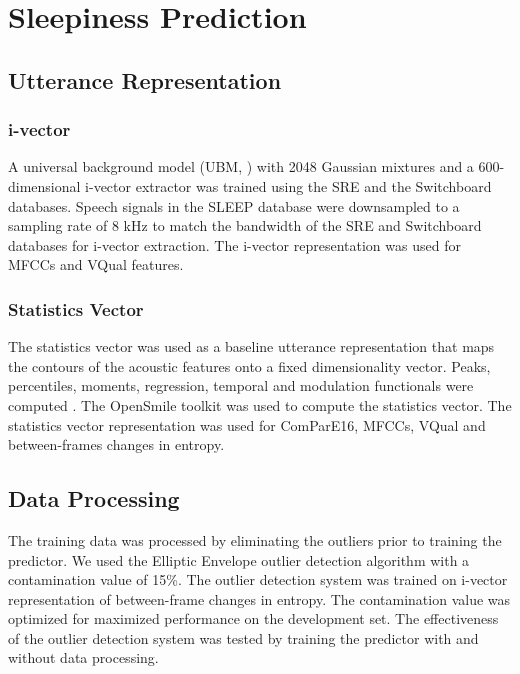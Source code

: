
\section{Sleepiness Prediction}

\subsection{Utterance Representation}
\subsubsection{i-vector}
  
A universal background model (UBM, \cite{dehak2011front}) with 2048 Gaussian mixtures and a 600-dimensional i-vector extractor was trained using the SRE and the Switchboard databases. Speech signals in the SLEEP database were downsampled to a sampling rate of 8 kHz to match the bandwidth of the SRE and Switchboard databases for i-vector extraction. The i-vector representation was used for MFCCs and VQual features.                                  

\subsubsection{Statistics Vector}

The statistics vector was used as a baseline utterance representation that maps the contours of the acoustic features onto a fixed dimensionality vector. Peaks, percentiles, moments, regression, temporal and modulation functionals were computed \cite{weninger2013acoustics}. The OpenSmile toolkit \cite{eyben2010opensmile} was used to compute the statistics vector. The statistics vector representation was used for  ComParE16, MFCCs, VQual and between-frames changes in entropy.


\subsection{Data Processing}

The training data was processed by eliminating the outliers prior to training the predictor. We used the Elliptic Envelope outlier detection algorithm with a contamination value of 15\%. The outlier detection system was trained on i-vector representation of between-frame changes in entropy. The contamination value was optimized for maximized performance on the development set. The effectiveness of the outlier detection system was tested by training the predictor with and without data processing. 




